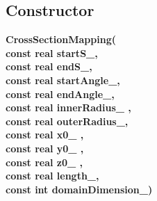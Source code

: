 \subsection{Constructor}
 
\newlength{\CrossSectionMappingIncludeArgIndent}
\begin{flushleft} \textbf{%
\settowidth{\CrossSectionMappingIncludeArgIndent}{CrossSectionMapping(}%
CrossSectionMapping(\\ 
\hspace{\CrossSectionMappingIncludeArgIndent}const real startS\_,\\ 
\hspace{\CrossSectionMappingIncludeArgIndent}const real endS\_,\\ 
\hspace{\CrossSectionMappingIncludeArgIndent}const real startAngle\_,\\ 
\hspace{\CrossSectionMappingIncludeArgIndent}const real endAngle\_,\\ 
\hspace{\CrossSectionMappingIncludeArgIndent}const real innerRadius\_ ,\\ 
\hspace{\CrossSectionMappingIncludeArgIndent}const real outerRadius\_,\\ 
\hspace{\CrossSectionMappingIncludeArgIndent}const real x0\_ ,\\ 
\hspace{\CrossSectionMappingIncludeArgIndent}const real y0\_ ,\\ 
\hspace{\CrossSectionMappingIncludeArgIndent}const real z0\_ ,\\ 
\hspace{\CrossSectionMappingIncludeArgIndent}const real length\_,\\ 
\hspace{\CrossSectionMappingIncludeArgIndent}const int domainDimension\_)
}\end{flushleft}
